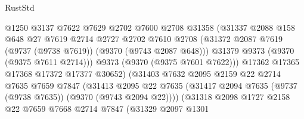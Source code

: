 \begin{lexlean}{RustStd}
\begin{coremodule}
{\begin{coremodule}
{{{{{{{{{{{{{{{{{{{{{{{{{{{{{{{{{{{{{{{                                @1250
                                @3137
                                @7622
                                @7629
                                @2702
                                @7600
                                @2708
                                @31358
                                (@31337
                                  @2088
                                  @158
                                  @648
                                  @27
                                  @7619
                                  @2714
                                  @2727
                                  @2702
                                  @7610
                                  @2708
                                  (@31372
                                    @2087
                                    @7619
                                    (@9737 (@9738 @7619))
                                    (@9370 (@9743 @2087 @648)))
                                  @31379
                                  @9373
                                  (@9370 (@9375 @7611 @2714)))
                                @9373
                                (@9370 (@9375 @7601 @7622)))
                              @17362
                              @17365
                              @17368
                              @17372
                              @17377
                              @30652)
                            (@31403
                              @7632
                              @2095
                              @2159
                              @22
                              @2714
                              @7635
                              @7659
                              @7847
                              (@31413
                                @2095
                                @22
                                @7635
                                (@31417
                                  @2094
                                  @7635
                                  (@9737 (@9738 @7635))
                                  (@9370 (@9743 @2094 @22))))
                              (@31318
                                @2098
                                @1727
                                @2158
                                @22
                                @7659
                                @7668
                                @2714
                                @7847
                                (@31329
                                  @2097
                                  @1301
}}}}}}}}}}}}}}}}}}}}}}}}}}}}}}}}}}}}}}}
\end{coremodule}}
\end{coremodule}
\end{lexlean}
